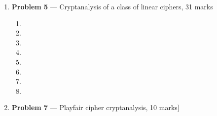 \documentclass[11pt]{article}
\theoremstyle{definition}
\begin{document}
\begin{enumerate}
\begin{enumerate}
\begin{enumerate}
			\item %
		\end{enumerate}
		
		\item %
		
		\begin{enumerate}
		
			\item %
			
			\item %
		
		\end{enumerate}
	\end{enumerate}
	
	
	\item[] \textbf{Problem 5} --- Cryptanalysis of a class of linear ciphers, 31 marks
	
	
	\begin{enumerate}
	\item %
	
	\item %
	
	\item %
	
	\item %
	
	\item %
	
	\item %
	
	\item %
	
	\item %
	\end{enumerate}
	
	
	\item[] \textbf{Problem 7} --- Playfair cipher cryptanalysis, 10 marks]

\end{enumerate}
\end{document}
